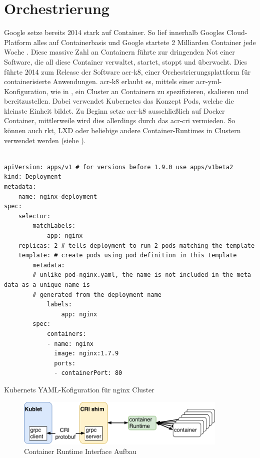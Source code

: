 \section{Orchestrierung}
\label{sec:aktuellesOrchestrierung}


Google setze bereits 2014 stark auf Container. So lief innerhalb Googles Cloud-Platform alles auf Containerbasis und Google startete 2 Milliarden Container jede Woche \citep{ContainersatScale}. Diese massive Zahl an Containern führte zur dringenden Not einer Software, die all diese Container verwaltet, startet, stoppt und überwacht. Dies führte 2014 zum Release der Software \gls{acr-k8}, einer Orchestrierungsplattform für containerisierte Anwendungen. \gls{acr-k8} erlaubt es, mittels einer \gls{acr-yml}-Konfiguration, wie in , ein Cluster an Containern zu spezifizieren, skalieren und bereitzustellen. Dabei verwendet Kubernetes das Konzept Pods, welche die kleinste Einheit bildet. Zu Beginn setze \gls{acr-k8} ausschließlich auf Docker Container, mittlerweile wird dies allerdings durch das \gls{acr-cri} vermieden. So können auch rkt, LXD oder beliebige andere Container-Runtimes in Clustern verwendet werden (siehe ).

\begin{listing}[hp]
	\begin{verbatim}

apiVersion: apps/v1 # for versions before 1.9.0 use apps/v1beta2
kind: Deployment
metadata:
    name: nginx-deployment
spec:
    selector:
        matchLabels:
            app: nginx
    replicas: 2 # tells deployment to run 2 pods matching the template
    template: # create pods using pod definition in this template
        metadata:
        # unlike pod-nginx.yaml, the name is not included in the meta data as a unique name is
        # generated from the deployment name
            labels:
                app: nginx
        spec:
            containers:
            - name: nginx
              image: nginx:1.7.9
              ports:
              - containerPort: 80
	\end{verbatim}
	\caption{Kubernets YAML-Kofiguration für nginx Cluster \citep{KubernetesDocumentation}}
	\label{lst:k8yaml}
\end{listing}

\begin{figure}[h]
	\begin{center}
		\includegraphics[width=0.9\textwidth]{bilder/cri.pdf}
		\caption{Container Runtime Interface Aufbau \citep{KubernetesDocumentation}}
		\label{fig:k8cri}
	\end{center}
\end{figure}

